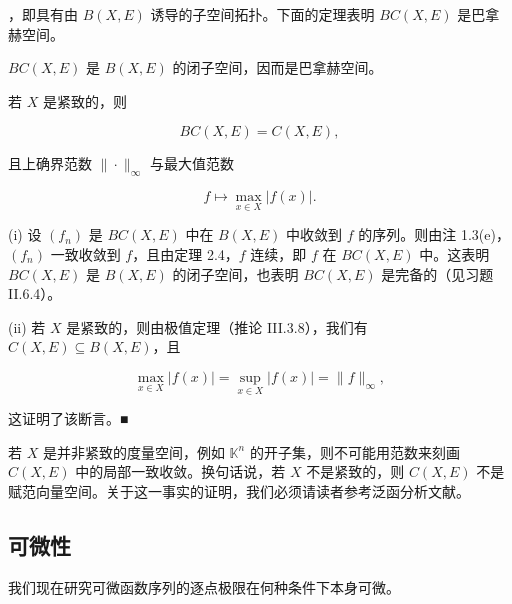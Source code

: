 ，即具有由 $ B(X,E) $ 诱导的子空间拓扑。下面的定理表明 $ BC(X,E) $ 是巴拿赫空间。

\begin{theorem}

\begin{subitems}
\item

$BC(X,E)$ 是 $B(X,E)$ 的闭子空间，因而是巴拿赫空间。

\item

若 $ X $ 是紧致的，则

\[
BC(X,E)=C(X,E),
\]

且上确界范数 $ \|\cdot\|_{\infty} $ 与最大值范数

\[
f\mapsto\max_{x\in X}|f(x)|.
\]

\proofhead
(i) 设 $(f_n)$ 是 $BC(X,E)$ 中在 $B(X,E)$ 中收敛到 $f$ 的序列。则由注 1.3(e)，$(f_n)$ 一致收敛到 $f$，且由定理 2.4，$f$ 连续，即 $f$ 在 $BC(X,E)$ 中。这表明 $BC(X,E)$ 是 $B(X,E)$ 的闭子空间，也表明 $BC(X,E)$ 是完备的（见习题 II.6.4）。
\end{subitems}

(ii) 若 $X$ 是紧致的，则由极值定理（推论 III.3.8），我们有 $C(X,E)\subseteq B(X,E)$，且

\[
\max_{x\in X}|f(x)|=\sup_{x\in X}|f(x)|=\|f\|_{\infty},
\]

这证明了该断言。■

\end{theorem}

\begin{remark}

若 $X$ 是并非紧致的度量空间，例如 $\mathbb{K}^n$ 的开子集，则不可能用范数来刻画 $C(X, E)$ 中的局部一致收敛。换句话说，若 $X$ 不是紧致的，则 $C(X, E)$ 不是赋范向量空间。关于这一事实的证明，我们必须请读者参考泛函分析文献。

\end{remark}

\subsection*{可微性}

我们现在研究可微函数序列的逐点极限在何种条件下本身可微。

